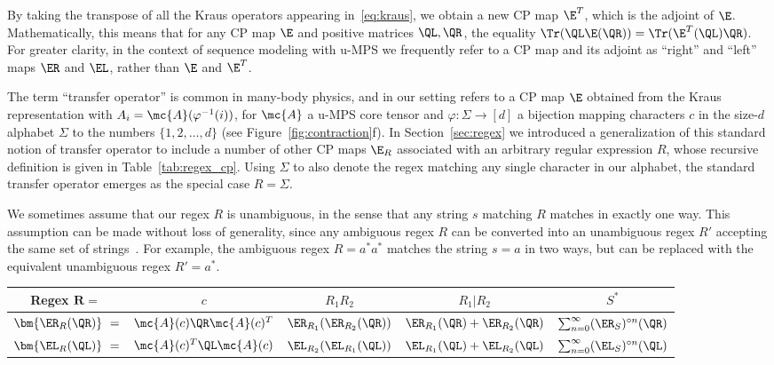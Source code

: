 By taking the transpose of all the Kraus operators appearing in~\eqref{eq:kraus}, we obtain a new CP map $\E^T$, which is the adjoint of $\E$. Mathematically, this means that for any CP map $\E$ and positive matrices $\QL, \QR$, the equality $\Tr(\QL \E(\QR)) = \Tr(\E^T(\QL) \QR)$. For greater clarity, in the context of sequence modeling with u-MPS we frequently refer to a CP map and its adjoint as ``right'' and ``left'' maps $\ER$ and $\EL$, rather than $\E$ and $\E^T$.

The term ``transfer operator'' is common in many-body physics, and in our setting refers to a CP map $\E$ obtained from the Kraus representation with $A_i = \mc{A}(\varphi^{-1}(i))$, for $\mc{A}$ a u-MPS core tensor and $\varphi: \Sigma \to [d]$ a bijection mapping characters $c$ in the size-$d$ alphabet $\Sigma$ to the numbers $\{1, 2, \ldots, d\}$ (see Figure~\ref{fig:contraction}f). 
In Section~\ref{sec:regex} 
we introduced a generalization of this standard notion of transfer operator to include a number of other CP maps $\E_R$ associated with an arbitrary regular expression $R$, whose recursive definition is given in Table~\ref{tab:regex_cp}. 
Using $\Sigma$ to also denote the regex matching any single character in our alphabet, the standard transfer operator emerges as the special case $R = \Sigma$.

We sometimes assume that our regex $R$ is unambiguous, in the sense that any string $s$ matching $R$ matches in exactly one way. This assumption can be made without loss of generality, since any ambiguous regex $R$ can be converted into an unambiguous regex $R'$ accepting the same set of strings~\citep{book1971}. For example, the ambiguous regex $R = a^*a^*$ matches the string $s = a$ in two ways, but can be replaced with the equivalent unambiguous regex $R' = a^*$. 
%
\begin{table}[t]
\begin{center}
\begin{small}
\begin{sc}
\begin{tabular}{c|cccc}
    \textbf{Regex} $\mathbf{R =\ }$ & $c$ & $R_1 R_2$ & $R_1 | R_2$ & $S^*$ \\
    \midrule
    $\bm{\ER_R(\QR)}\ = $ & $\mc{A}(c) \QR \mc{A}(c)^T$ & $\ER_{R_1}(\ER_{R_2}(\QR))$ & $\ER_{R_1}(\QR) + \ER_{R_2}(\QR)$ & $\sum_{n=0}^\infty (\ER_S)^{\circ n}(\QR)$ \\
    $\bm{\EL_R(\QL)}\ = $ & $\mc{A}(c)^T \QL \mc{A}(c)$ & $\EL_{R_2}(\EL_{R_1}(\QL))$ & $\EL_{R_1}(\QL) + \EL_{R_2}(\QL)$ & $\sum_{n=0}^\infty (\EL_S)^{\circ n}(\QL)$
\end{tabular}
\end{sc}
\end{small}
\end{center}
\vskip -0.1in
\end{table}

